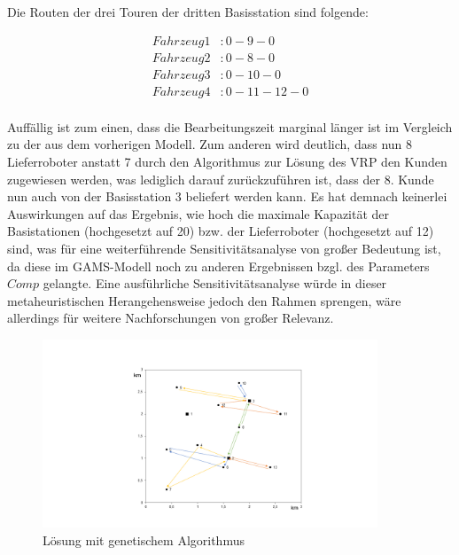 \documentclass[a4paper,12pt,parskip,bibtotoc,liststotoc]{article}
\begin{document}
Die Routen der drei Touren der dritten Basisstation sind folgende: 

\begin{equation} \label{eq:test}
    \begin{aligned} 
         Fahrzeug 1&: 0 - 9 - 0 \\
        Fahrzeug 2&: 0 - 8 - 0\\
         Fahrzeug 3&: 0 - 10 - 0\\
         Fahrzeug 4&: 0 - 11 - 12 - 0\\
    \end{aligned}
\end{equation}


Auffällig ist zum einen, dass die Bearbeitungszeit marginal länger ist im Vergleich zu der aus dem vorherigen Modell. 
Zum anderen wird deutlich, dass nun 8 Lieferroboter anstatt 7 durch den Algorithmus zur Lösung des VRP den Kunden zugewiesen werden, was lediglich darauf zurückzuführen ist, dass der 8. Kunde nun auch von der Basisstation 3 beliefert werden kann.
Es hat demnach keinerlei Auswirkungen auf das Ergebnis, wie hoch die maximale Kapazität der Basistationen (hochgesetzt auf 20) bzw. der Lieferroboter (hochgesetzt auf 12) sind, was für eine weiterführende Sensitivitätsanalyse von großer Bedeutung ist, da diese im GAMS-Modell noch zu anderen Ergebnissen bzgl. des Parameters $Comp$ gelangte.
Eine ausführliche Sensitivitätsanalyse würde in dieser metaheuristischen Herangehensweise jedoch den Rahmen sprengen, wäre allerdings für weitere Nachforschungen von großer Relevanz.\\


\begin{figure}[h!]
  \begin{center}
      \includegraphics[width=100mm]{vrp44.png}
    \caption{Lösung mit genetischem Algorithmus}  \label{Typen}
  \end{center}
\end{figure}
\end{document}
